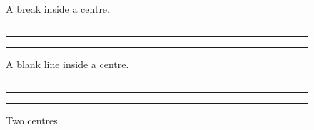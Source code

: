 \documentclass{article}
\begin{document}
\begin{figure}
\begin{center}
\subfigure[One]{\rule{0.3\textwidth}{1cm}}
\subfigure[Two]{\rule{0.3\textwidth}{1cm}} \\
\subfigure[Three]{\rule{0.3\textwidth}{1cm}}
\end{center}
\caption{A break inside a centre.}
\end{figure}
\begin{figure}
\begin{center}
\rule{0.3\textwidth}{1cm}
\rule{0.3\textwidth}{1cm}

\rule{0.3\textwidth}{1cm}
\end{center}
\caption{A blank line inside a centre.}
\end{figure}
\begin{figure}
\begin{center}
\rule{0.3\textwidth}{1cm}
\end{center}
\begin{center}
\rule{0.3\textwidth}{1cm}
\rule{0.3\textwidth}{1cm}
\end{center}
\caption{Two centres.}
\end{figure}
\end{document}
